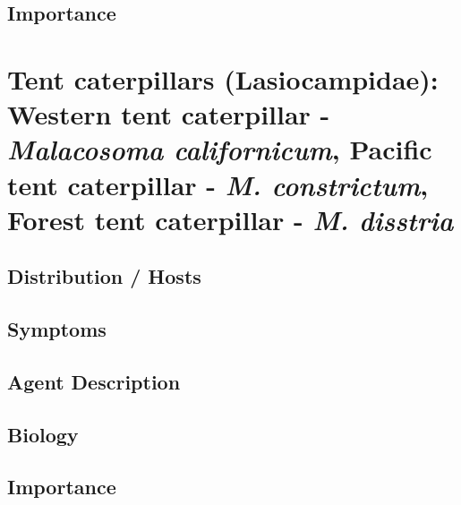 \documentclass[
]{book}
\begin{document}
\subsection*{Importance}\label{importance-2}

\section*{\texorpdfstring{Tent caterpillars (Lasiocampidae): Western tent caterpillar - \emph{Malacosoma californicum}, Pacific tent caterpillar - \emph{M. constrictum}, Forest tent caterpillar - \emph{M. disstria}}{Tent caterpillars (Lasiocampidae): Western tent caterpillar - Malacosoma californicum, Pacific tent caterpillar - M. constrictum, Forest tent caterpillar - M. disstria}}\label{tent-caterpillars-lasiocampidae-western-tent-caterpillar---malacosoma-californicum-pacific-tent-caterpillar---m.-constrictum-forest-tent-caterpillar---m.-disstria}

\subsection*{Distribution / Hosts}\label{distribution-hosts-3}

\subsection*{Symptoms}\label{symptoms-3}

\subsection*{Agent Description}\label{agent-description-3}

\subsection*{Biology}\label{biology-3}

\subsection*{Importance}\label{importance-3}
\end{document}
